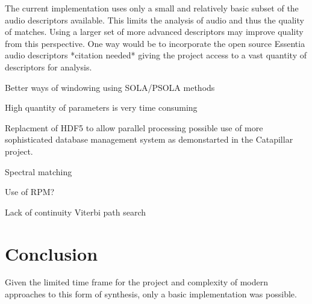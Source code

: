 \documentclass{scrartcl}
\begin{document}
    The current implementation uses only a small and relatively basic subset of
    the audio descriptors available. This limits the analysis of audio and thus
    the quality of matches. Using a larger set of more advanced descriptors may
    improve quality from this perspective. One way would be to incorporate the
    open source Essentia audio descriptors *citation needed* giving the project
    access to a vast quantity of descriptors for analysis.

    Better ways of windowing using SOLA/PSOLA methods

    High quantity of parameters is very time consuming ~\parencite{Petrushin2007} 

    Replacment of HDF5 to allow parallel processing 
    possible use of more sophisticated database management system as demonstarted in the Catapillar project.

    Spectral matching~\parencite{Hoffman2009} 

    Use of RPM?~\parencite[p.82]{Lindemann2007}

    Lack of continuity
    Viterbi path search~\parencite[p.1]{Schwarz2006a}

    \section*{Conclusion}
    Given the limited time frame for the project and complexity of modern
    approaches to this form of synthesis, only a basic implementation was
    possible.

    \printbibliography
\end{document}
